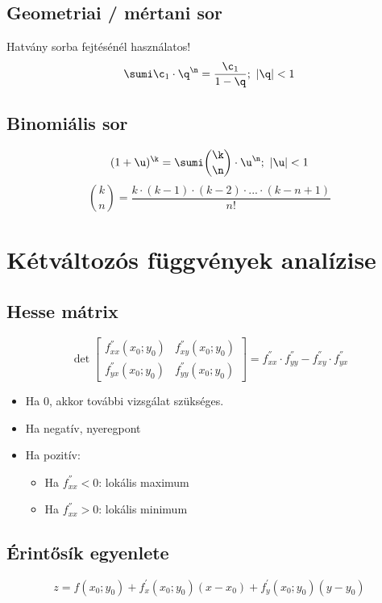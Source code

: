 \subsection*{Geometriai / mértani sor}
Hatvány sorba fejtésénél használatos!
\begin{equation}
\sumi \c_1 \cdot \q^{\n} = \frac{\c_1}{1-\q};\ |\q| < 1
\end{equation}

\subsection*{Binomiális sor}
\begin{equation}
  (1+\u)^{\k} = \sumi \binom{\k}{\n} \cdot {\u}^{\n};\ |\u| < 1
\end{equation}
\begin{equation}
  \binom{k}{n} = \frac{k \cdot (k-1) \cdot (k-2)\cdot ... \cdot (k-n+1)}{n!}
\end{equation}

\newpage

\section*{Kétváltozós függvények analízise}
\subsection*{Hesse mátrix}
\begin{equation}
  \det
\begin{bmatrix}
  f^{''}_{xx}(x_0;y_0) & f^{''}_{xy}(x_0;y_0) \\
  f^{''}_{yx}(x_0;y_0) & f^{''}_{yy}(x_0;y_0)
\end{bmatrix}
= f^{''}_{xx} \cdot f^{''}_{yy} - f^{''}_{xy} \cdot  f^{''}_{yx}
\end{equation}
\begin{itemize}
\item Ha 0, akkor további vizsgálat szükséges.
\item Ha negatív, nyeregpont
\item Ha pozitív:
  \begin{itemize}
  \item Ha $f^{''}_{xx} < 0$: lokális maximum
  \item Ha $f^{''}_{xx} > 0$: lokális minimum
  \end{itemize}
\end{itemize}
\subsection*{Érintősík egyenlete}
\begin{equation}
z = f(x_0;y_0) + f^{'}_x(x_0;y_0)(x-x_0) + f^{'}_y(x_0;y_0)(y-y_0)
\end{equation}

